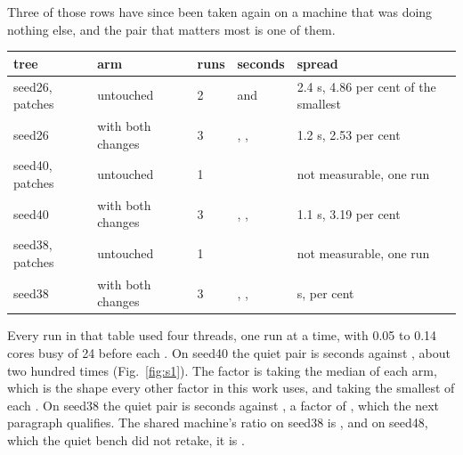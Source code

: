 Three of those rows have since been taken again on a machine that was doing nothing else, and the pair that matters most is one of them.

\begin{table}[t]
\centering
\small
\begin{tabularx}{\textwidth}{XXXXX}
\toprule
tree & arm & runs & seconds & spread \\
\midrule
seed26, \SeedPatchesTwentySix{} patches & untouched & 2 & \BenchPlainSeedTwentySixMax{} and \BenchPlainSeedTwentySixMin{} & 2.4 s, 4.86 per cent of the smallest \\
seed26 & with both changes & 3 & \BenchBothSeedTwentySixMin{}, \BenchBothSeedTwentySixMax{}, \BenchBothSeedTwentySixMedian{} & 1.2 s, 2.53 per cent \\
seed40, \SeedPatchesForty{} patches & untouched & 1 & \BenchPlainSeedFortyMax{} & not measurable, one run \\
seed40 & with both changes & 3 & \BenchBothSeedFortyMax{}, \BenchBothSeedFortyMedian{}, \BenchBothSeedFortyMin{} & 1.1 s, 3.19 per cent \\
seed38, \SeedPatchesThirtyEight{} patches & untouched & 1 & \BenchPlainSeedThirtyEightMax{} & not measurable, one run \\
seed38 & with both changes & 3 & \BenchBothSeedThirtyEightMax{}, \BenchBothSeedThirtyEightMedian{}, \BenchBothSeedThirtyEightMin{} & \BenchBothSeedThirtyEightSpread{} s, \BenchBothSeedThirtyEightSpreadPct{} per cent \\
\bottomrule
\end{tabularx}
\end{table}

Every run in that table used four threads, one run at a time, with 0.05 to 0.14 cores busy of 24 before each {}. On seed40 the quiet pair is \BenchPlainSeedFortyMax{} seconds against \BenchBothSeedFortyMedian{}, about two hundred times (Fig.~\ref{fig:s1}). The factor is \QuietFactorSeedFortyMedian{} taking the median of each arm, which is the shape every other factor in this work uses, and \QuietFactorSeedFortySmallest{} taking the smallest of each {}. On seed38 the quiet pair is \BenchPlainSeedThirtyEightMax{} seconds against \BenchBothSeedThirtyEightMedian{}, a factor of \QuietFactorSeedThirtyEightMedian{}, which the next paragraph qualifies. The shared machine's ratio on seed38 is \SharedRatioSeedThirtyEight{}, and on seed48, which the quiet bench did not retake, it is \SharedRatioSeedFortyEight{} {}.

